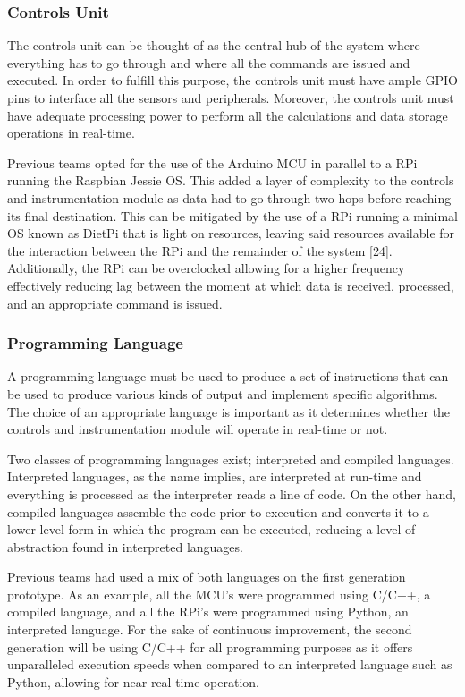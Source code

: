 \subsubsection{Controls Unit}

\indent\indent The controls unit can be thought of as the central hub of the system where everything has to go through and where all the commands are issued and executed. In order to fulfill this purpose, the controls unit must have ample GPIO pins to interface all the sensors and peripherals. Moreover, the controls unit must have adequate processing power to perform all the calculations and data storage operations in real-time.

\indent Previous teams opted for the use of the Arduino MCU in parallel to a RPi running the Raspbian Jessie OS. This added a layer of complexity to the controls and instrumentation module as data had to go through two hops before reaching its final destination. This can be mitigated by the use of a RPi running a minimal OS known as DietPi that is light on resources, leaving said resources available for the interaction between the RPi and the remainder of the system [24]. Additionally, the RPi can be overclocked allowing for a higher frequency effectively reducing lag between the moment at which data is received, processed, and an appropriate command is issued.

\subsubsection{Programming Language}

\indent\indent A programming language must be used to produce a set of instructions that can be used to produce various kinds of output and implement specific algorithms. The choice of an appropriate language is important as it determines whether the controls and instrumentation module will operate in real-time or not.

\indent Two classes of programming languages exist; interpreted and compiled languages. Interpreted languages, as the name implies, are interpreted at run-time and everything is processed as the interpreter reads a line of code. On the other hand, compiled languages assemble the code prior to execution and converts it to a lower-level form in which the program can be executed, reducing a level of abstraction found in interpreted languages.

\indent Previous teams had used a mix of both languages on the first generation prototype. As an example, all the MCU’s were programmed using C/C++, a compiled language, and all the RPi’s were programmed using Python, an interpreted language. For the sake of continuous improvement, the second generation will be using C/C++ for all programming purposes as it offers unparalleled execution speeds when compared to an interpreted language such as Python, allowing for near real-time operation.

